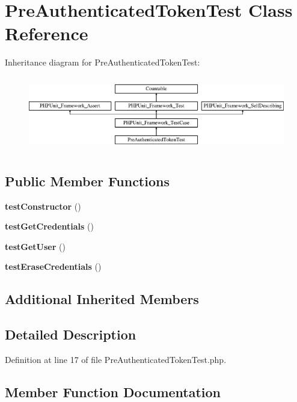 \section{Pre\+Authenticated\+Token\+Test Class Reference}
\label{class_symfony_1_1_component_1_1_security_1_1_core_1_1_tests_1_1_authentication_1_1_token_1_1_pre_authenticated_token_test}
Inheritance diagram for Pre\+Authenticated\+Token\+Test\+:\begin{figure}[H]
\begin{center}
\leavevmode
\includegraphics[height=3.303835cm]{class_symfony_1_1_component_1_1_security_1_1_core_1_1_tests_1_1_authentication_1_1_token_1_1_pre_authenticated_token_test}
\end{center}
\end{figure}
\subsection*{Public Member Functions}
\begin{DoxyCompactItemize}
\item 
{\bf test\+Constructor} ()
\item 
{\bf test\+Get\+Credentials} ()
\item 
{\bf test\+Get\+User} ()
\item 
{\bf test\+Erase\+Credentials} ()
\end{DoxyCompactItemize}
\subsection*{Additional Inherited Members}


\subsection{Detailed Description}


Definition at line 17 of file Pre\+Authenticated\+Token\+Test.\+php.



\subsection{Member Function Documentation}
